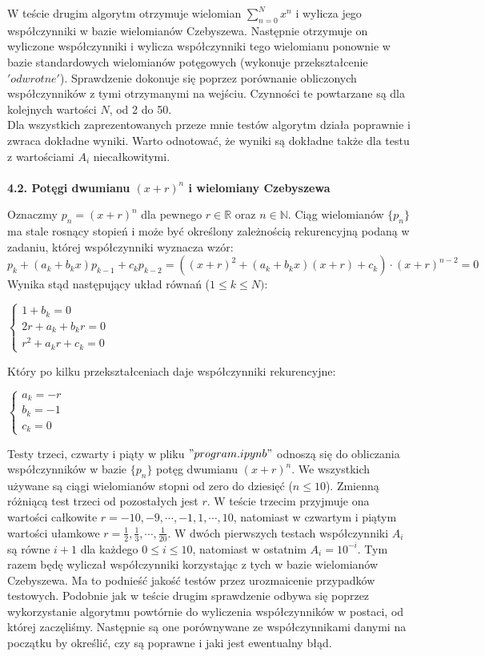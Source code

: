 \documentclass[a4paper]{article}
\begin{document}
W teście drugim algorytm otrzymuje wielomian $\sum_{n=0}^{N} x^n$ i wylicza jego współczynniki w bazie wielomianów Czebyszewa. Następnie otrzymuje on wyliczone współczynniki i wylicza współczynniki tego wielomianu ponownie w bazie standardowych wielomianów potęgowych (wykonuje przekształcenie $'odwrotne'$). Sprawdzenie dokonuje się poprzez porównanie obliczonych współczynników z tymi otrzymanymi na wejściu. Czynności te powtarzane są dla kolejnych wartości $N$, od 2 do 50.\\

Dla wszystkich zaprezentowanych przeze mnie testów algorytm działa poprawnie i zwraca dokładne wyniki. Warto odnotować, że wyniki są dokładne także dla testu z wartościami $A_i$ niecałkowitymi.\\\\

\large
\textbf{4.2. Potęgi dwumianu $(x+r)^n$ i wielomiany Czebyszewa}\\
\normalsize

Oznaczmy $p_n = (x+r)^n$ dla pewnego $r \in \mathbb{R}$ oraz $n \in \mathbb{N}$. Ciąg wielomianów $\{p_n\}$ ma stale rosnący stopień i może być określony zależnością rekurencyjną podaną w zadaniu, której współczynniki wyznacza wzór:
$$p_k + (a_k + b_kx)p_{k-1} + c_k p_{k-2} = ((x + r)^2 + (a_k + b_kx)(x + r) + c_k) \cdot (x + r)^{n-2} = 0 $$
Wynika stąd następujący układ równań ($ 1 \leq k \leq N)$:
\begin{center}
$\begin{cases}
1 + b_k = 0\\
2r + a_k + b_kr = 0\\
r^2 + a_k r + c_k = 0
\end{cases}$
\end{center}
\newpage
Który po kilku przekształceniach daje współczynniki rekurencyjne:
\begin{center}
$\begin{cases}
a_k = -r\\
b_k = -1\\
c_k = 0
\end{cases}$
\end{center}

Testy trzeci, czwarty i piąty w pliku $"program.ipynb"$ odnoszą się do obliczania współczynników w bazie $\{p_n\}$ potęg dwumianu $(x+r)^n$. We wszystkich używane są ciągi wielomianów stopni od zero do dziesięć ($n \leq 10$). Zmienną różniącą test trzeci od pozostałych jest $r$. W teście trzecim przyjmuje ona wartości całkowite $r = -10,-9,\cdots,-1,1,\cdots,10$, natomiast w czwartym i piątym wartości ułamkowe $r= \frac{1}{2}, \frac{1}{3}, \cdots, \frac{1}{20}$. W dwóch pierwszych testach współczynniki $A_i$ są równe $i+1$ dla każdego $0 \leq i \leq 10$, natomiast w ostatnim $A_i = 10^{-i}$. Tym razem będę wyliczał współczynniki korzystając z tych w bazie wielomianów Czebyszewa. Ma to podnieść jakość testów przez urozmaicenie przypadków testowych. Podobnie jak w teście drugim sprawdzenie odbywa się poprzez wykorzystanie algorytmu powtórnie do wyliczenia współczynników w postaci, od której zaczęliśmy. Następnie są one porównywane ze współczynnikami danymi na początku by określić, czy są poprawne i jaki jest ewentualny błąd.\\
\end{document}
